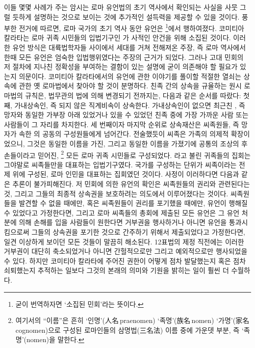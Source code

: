 이들 몇몇 사례가 주는 암시는
로마 유언법의 초기 역사에서 확인되는 사실을 사뭇 그럴 듯하게 설명하는 것으로
보이는 것에 추가적인 설득력을 제공할 수 있을 것이다.
\label{comitiacalata}%
풍부한 전거에 따르면,
로마 국가의 초기 역사 동안 유언은
\footnote{굳이 번역하자면
`소집된 민회'라는 뜻이다.}에서 행하여졌다.
코미티아 칼라타는 로마 귀족 시민들의 입법기구인
가 사적인 안건을 위해 소집된 것이다.
이러한 유언 방식은 대륙법학자들 사이에서 세대를 거쳐 전해져온 주장,
즉 로마 역사에서 한때 모든 유언은 엄숙한 입법행위였다는 주장의
근거가 되었다.
그러나 고대 민회의 저 절차에 지나친 정확성을 부여하는 결함이 있는
설명에 굳이 의존해야 할 필요가 있는지 의문이다.
코미티아 칼라타에서의 유언에 관한 이야기를 풀이할 적절한 열쇠는
상속에 관한 옛 로마법에서 찾아야 할 것이 분명하다.
친족 간의 상속을 규율하는 원시 로마법의 규칙은,
법무관의 법에 의해 변경되기 전까지는,
다음과 같은 순서를 따랐다:
첫째, 가내상속인, 즉 되지 않은
직계비속이 상속한다.
가내상속인이 없으면 최근친 ,
즉 망자와 동일한 가부장 아래 있었거나 있을 수 있었던 친족 중에
가장 가까운 사람 또는 사람들이
그 자리를 차지한다.
세 번째이자 마지막 순위로 상속재산은 씨족원들, 즉
망자가 속한 의 공동의 구성원들에게 넘어간다.
전술했듯이 씨족은 가족의 의제적 확장이었으니, 그것은
동일한 이름을 가진,
그리고 동일한 이름을 가졌기에 공통의 조상의 후손들이라고 믿어진,%
\footnote{여기서의 ``이름''은 흔히
  `인명'(人名\,praenomen) `족명'(族名\,nomen) `가명'(家名\,cognomen)으로
  구성된 로마인들의 삼명법(三名法) 이름 중에 가운뎃 부분,
  즉 `족명'(nomen)을 말한다.}
모든 로마 귀족 시민들로 구성되었다.
라고 불린 귀족들의 집회는 그야말로 씨족들만을 대표하는 입법기구였다.
국가를 구성하는 단위가 씨족이라는 전제 위에 구성된,
로마 인민을 대표하는 집회였던 것이다.
사정이 이러하다면 다음과 같은 추론이 불가피해진다.
저 민회에 의한 유언의 확인은 씨족원들의 권리와 관련된다는 것,
그리고 그들의 최종적 상속권을 보호하려는 의도에서 이루어졌다는 것이다.
씨족원들을 발견할 수 없을 때에만,
혹은 씨족원들이 권리를 포기했을 때에만,
유언이 행해질 수 있었다고 가정한다면,
그리고 로마 씨족들의 총회에 제출된 모든 유언은
그 유언 처분에 의해 손해를 입을 사람들이 원한다면 거부권을 행사하거나
아니면 유언을 통과시킴으로써 그들의 상속권을 포기한 것으로 간주하기 위해서
제출되었다고 가정한다면,
일견 이상하게 보이던 모든 것들이 말끔히 해소된다.
12표법의 제정 직전에는 이러한 거부권이 대단히 축소되었거나
아니면 간헐적으로만 그리고 예외적으로만
행사되었을 수 있다.
하지만 코미티아 칼라타에 주어진 권한이 어떻게 점차 발달했는지 혹은
점차 쇠퇴했는지 추적하는 일보다 그것의 본래의 의미와 기원을 밝히는 일이
훨씬 더 수월하다.

